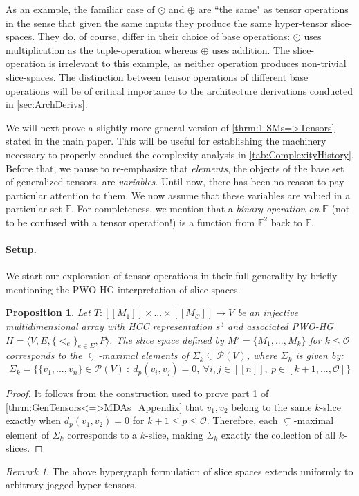 \documentclass{article}
\theoremstyle{plain}
\newtheorem{proposition}[theorem]{Proposition}
\theoremstyle{definition}
\theoremstyle{remark}
\newtheorem{remark}[theorem]{Remark}
\newcommand{\cO}{\mathcal{O}}
\newcommand{\cP}{\mathcal{P}}
\let\oldparagraph\paragraph
\renewcommand{\paragraph}[1]{%
	\vspace{-0.5em}%
	\oldparagraph{#1}%
}
\begin{document}
As an example, the familiar case of $\odot$ and $\oplus$ are ``the same" as tensor operations in the sense that given the same inputs they produce the same hyper-tensor slice-spaces. They do, of course, differ in their choice of base operations: $\odot$ uses multiplication as the tuple-operation whereas $\oplus$ uses addition. The slice-operation is irrelevant to this example, as neither operation produces non-trivial slice-spaces. The distinction between tensor operations of different base operations will be of critical importance to the architecture derivations conducted in \cref{sec:ArchDerivs}.

We will next prove a slightly more general version of \cref{thrm:1-SMs=>Tensors} stated in the main paper. This will be useful for establishing the machinery necessary to properly conduct the complexity analysis in \cref{tab:ComplexityHistory}. Before that, we pause to re-emphasize that \textit{elements}, the objects of the base set of generalized tensors, are \textit{variables}. Until now, there has been no reason to pay particular attention to them. We now assume that these variables are valued in a particular set $\mathbb{F}$. For completeness, we mention that a \textit{binary operation on $\mathbb{F}$} (not to be confused with a tensor operation!) is a function from $\mathbb{F}^2$ back to $\mathbb{F}$.

\paragraph{Setup.} We start our exploration of tensor operations in their full generality by briefly mentioning the PWO-HG interpretation of slice spaces.
\begin{proposition}
	Let $T: [[M_1]] \times ... \times [[M_{\cO}]] \rightarrow V$ be an injective multidimensional array with HCC representation $s^3$ and associated PWO-HG $H = \big\langle V, E, \{<_e\}_{e \in E}, P \big\rangle$. The slice space defined by $M' = \{M_1, ..., M_k\}$ for $k \leq \cO$ corresponds to the $\subsetneq$-maximal elements of $\varSigma_k \subsetneq \cP(V)$, where $\varSigma_k$ is given by:
	\begin{equation*}
		\varSigma_k = \big\{ \{v_1, ..., v_n\} \in \cP(V) \ : \ d_p(v_i, v_j) = 0, \ \forall i,j \in [[n]], \ p \in [k+1, ..., \cO]\big\}
	\end{equation*}
	\label{prop:HG-SSs}
\end{proposition}
\begin{proof}
	It follows from the construction used to prove part 1 of \cref{thrm:GenTensors<=>MDAs_Appendix} that $v_1, v_2$ belong to the same $k$-slice exactly when $d_p(v_1, v_2) = 0$ for $k+1 \leq p \leq \cO$. Therefore, each $\subsetneq$-maximal element of $\varSigma_k$ corresponds to a $k$-slice, making $\varSigma_k$ exactly the collection of all $k$-slices.
\end{proof}
\begin{remark}
	The above hypergraph formulation of slice spaces extends uniformly to arbitrary jagged hyper-tensors.
\end{remark}
\end{document}
